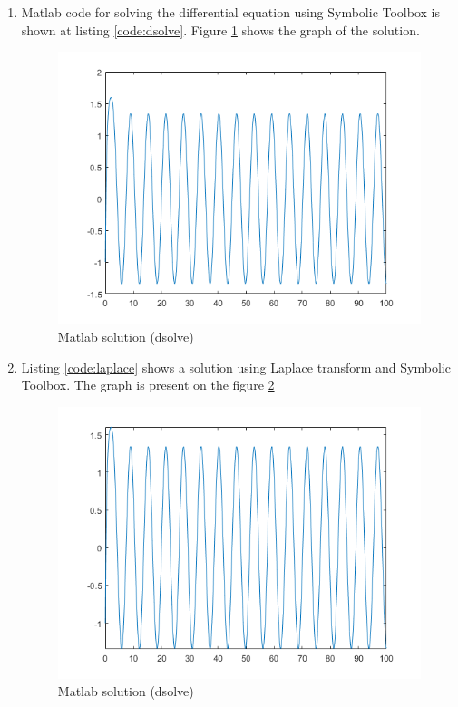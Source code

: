\documentclass[12pt,letterpaper]{article}
\begin{document}
\begin{enumerate}[leftmargin=!,labelindent=5pt]
    \item Matlab code for solving the differential equation using Symbolic Toolbox is shown at listing \ref{code:dsolve}. Figure \ref{fig:dsolve_out} shows the graph of the solution.
        \newpage
        
    \begin{figure}[H]
            \centering
            \includegraphics[width=15cm]{images/output/ex1_dsolve_out.png}
            \caption{Matlab solution (dsolve)}
            \label{fig:dsolve_out}
        \end{figure}

    \item Listing \ref{code:laplace} shows a solution using Laplace transform and Symbolic Toolbox. The graph is present on the figure \ref{fig:laplace_out}
        
        \begin{figure}[H]
            \centering
            \includegraphics[width=15cm]{images/output/ex1_laplace_out.png}
            \caption{Matlab solution (dsolve)}
            \label{fig:laplace_out}
        \end{figure}
\end{enumerate}
\end{document}
